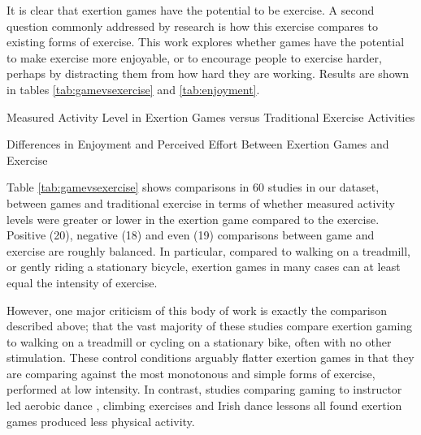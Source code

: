 It is clear that exertion games have the potential to be exercise. A second question commonly addressed by research is how this exercise compares to existing forms of exercise. This work explores whether games have the potential to make exercise more enjoyable, or to encourage people to exercise harder, perhaps by distracting them from how hard they are working. Results are shown in tables \ref{tab:gamevsexercise} and \ref{tab:enjoyment}.

\begin{table}
\caption{Measured Activity Level in Exertion Games versus Traditional Exercise Activities}
\label{tab:gamevsexercise}
\centering

\end{table}

\begin{table}
\caption{Differences in Enjoyment and Perceived Effort Between Exertion Games and Exercise}
\label{tab:enjoyment}
\centering


\end{table}

Table \ref{tab:gamevsexercise} shows comparisons in 60 studies in our dataset, between games and traditional exercise in terms of whether measured activity levels were greater or lower in the exertion game compared to the exercise. Positive (20), negative (18) and even (19) comparisons between game and exercise are roughly balanced. In particular, compared to walking on a treadmill, or gently riding a stationary bicycle, exertion games in many cases can at least equal the intensity of exercise. 

However, one major criticism of this body of work is exactly the comparison described above; that the vast majority of these studies compare exertion gaming to walking on a treadmill or cycling on a stationary bike, often with no other stimulation. These control conditions arguably flatter exertion games in that they are comparing against the most monotonous and simple forms of exercise, performed at low intensity. In contrast, studies comparing gaming to instructor led aerobic dance \cite{Gao2013ChildrenSDance,eason2016comparison}, climbing exercises \cite{Sell2011EnergyActivities} and Irish dance lessons \cite{Rincker2017TheFitness} all found exertion games produced less physical activity. 

